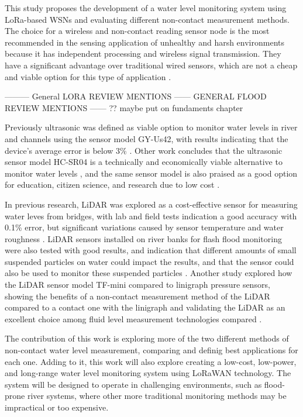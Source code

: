 This study proposes the development of a water level monitoring system using LoRa-based WSNs and evaluating different non-contact measurement methods. The choice for a wireless and non-contact reading sensor node is the most recommended in the sensing application of unhealthy and harsh environments because it has independent processing and wireless signal transmission. They have a significant advantage over traditional wired sensors, which are not a cheap and viable option for this type of application \cite{bhuyan_2010_intelligent}.



--------- General LORA REVIEW MENTIONS ------  GENERAL FLOOD REVIEW MENTIONS ------ ?? maybe put on fundaments chapter

Previously ultrasonic was defined as viable option to monitor water levels in river and channels using the sensor model GY-Us42, with results indicating that the device's average error is below 3\% \cite{mohammadrezamasoudimoghaddam_2024_a}. Other work concludes that the ultrasonic sensor model HC-SR04 is a technically and economically viable alternative to monitor water levels \cite{ pereira_2022_evaluation}, and the same sensor model is also praised as a good option for education, citizen science, and research due to low cost \cite{bresnahan_2023_a}. 

In previous research, LiDAR was explored as a cost-effective sensor for measuring water leves from bridges, with lab and field tests indication a good accuracy with 0.1\% error, but significant variations caused by sensor temperature and water roughness \cite{paul_2020_a}. LiDAR sensors installed on river banks for flash flood monitoring were also tested with good results, and indication that different amounts of small suspended particles on water could impact the results, and that the sensor could also be used to monitor these suspended particles \cite{tamari_2016_flash}. Another study explored how the LiDAR sensor model TF-mini compared to linigraph pressure sensors, showing the benefits of a non-contact measurement method of the LiDAR compared to a contact one with the linigraph and validating the LiDAR as an excellent choice among fluid level measurement technologies compared \cite{santana_2024_development}.

The contribution of this work is exploring more of the two different methods of non-contact water level measurement, comparing and definig best applications for each one. Adding to it, this work will also explore creating a low-cost, low-power, and long-range water level monitoring system using LoRaWAN technology. The system will be designed to operate in challenging environments, such as flood-prone river systems, where other more traditional monitoring methods may be impractical or too expensive.
